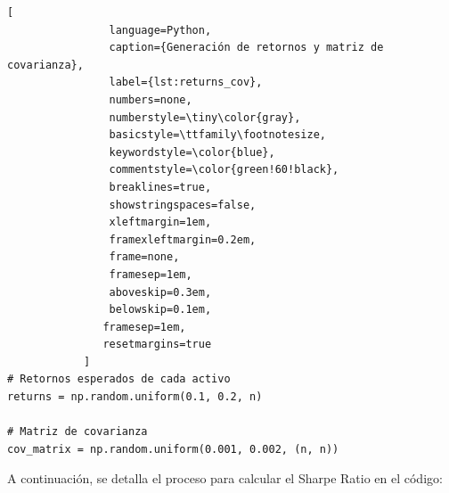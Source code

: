 \documentclass[9pt,a4paper,twoside]{rho-class/rho}
\begin{document}
            \begin{lstlisting}[
                language=Python,
                caption={Generación de retornos y matriz de covarianza},
                label={lst:returns_cov},
                numbers=none,
                numberstyle=\tiny\color{gray},
                basicstyle=\ttfamily\footnotesize,
                keywordstyle=\color{blue},
                commentstyle=\color{green!60!black},
                breaklines=true,
                showstringspaces=false,
                xleftmargin=1em,
                framexleftmargin=0.2em,
                frame=none,
                framesep=1em,
                aboveskip=0.3em,
                belowskip=0.1em,
               framesep=1em, 
               resetmargins=true
            ]
# Retornos esperados de cada activo
returns = np.random.uniform(0.1, 0.2, n)

# Matriz de covarianza
cov_matrix = np.random.uniform(0.001, 0.002, (n, n))
            \end{lstlisting}
            A continuación, se detalla el proceso para calcular el Sharpe Ratio en el código:\\
\end{document}
